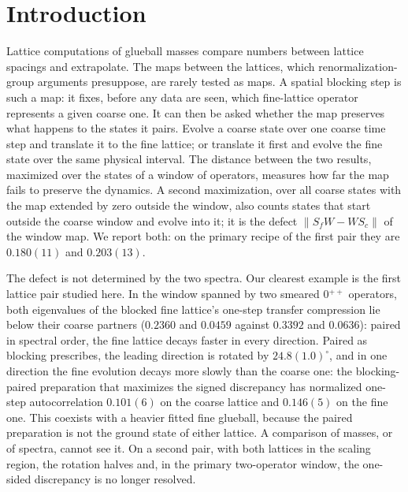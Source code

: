 \documentclass[11pt]{article}
\begin{document}
\section{Introduction}

Lattice computations of glueball masses compare numbers between lattice spacings and extrapolate. The
maps between the lattices, which renormalization-group arguments presuppose, are rarely tested as maps.
A spatial blocking step is such a map: it fixes, before any data are seen, which fine-lattice operator
represents a given coarse one. It can then be asked whether the map preserves what happens to the
states it pairs. Evolve a coarse state over one coarse time step and translate it to the fine lattice;
or translate it first and evolve the fine state over the same physical interval. The distance between
the two results, maximized over the states of a window of operators, measures how far the map fails to
preserve the dynamics. A second maximization, over all coarse states with the map extended by zero
outside the window, also counts states that start outside the coarse window and evolve into it; it is
the defect $\|S_fW-WS_c\|$ of the window map. We report both: on the primary recipe of the first pair
they are $0.180(11)$ and $0.203(13)$.

The defect is not determined by the two spectra. Our clearest example is the first lattice pair studied
here. In the window spanned by two smeared 0$^{++}$ operators, both eigenvalues of the blocked fine
lattice's one-step transfer compression lie below their coarse partners ($0.2360$ and $0.0459$ against
$0.3392$ and $0.0636$): paired in spectral order, the fine lattice decays faster in every direction. Paired
as blocking prescribes, the leading direction is rotated by $24.8(1.0)^\circ$, and in one direction the fine
evolution decays more slowly than the coarse one: the blocking-paired preparation that maximizes the
signed discrepancy has normalized one-step autocorrelation $0.101(6)$ on the coarse lattice and $0.146(5)$
on the fine one. This coexists with a heavier fitted fine glueball, because the paired preparation is not
the ground state of either lattice. A comparison of masses, or of spectra, cannot see it. On a second
pair, with both lattices in the scaling region, the rotation halves and, in the primary two-operator
window, the one-sided discrepancy is no longer resolved.
\end{document}

